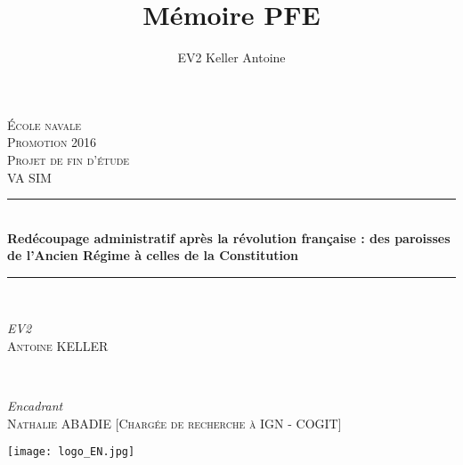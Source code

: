 \documentclass[a4paper]{book}
\title{Mémoire PFE}
\author{EV2 Keller Antoine}
\begin{document}
\begin{titlepage} %
	\newcommand{\HRule}{\rule{\linewidth}{0.5mm}} %
	
	\center %
	
	
	\textsc{\LARGE École navale}\\[0.5cm] 
	\textsc{\LARGE Promotion 2016}\\[0.5cm]
	\textsc{\Large Projet de fin d'étude}\\[0.5cm] 
	\textsc{\large VA SIM}\\[0.5cm] 
	\HRule\\[0.4cm]
	
	{\huge\bfseries  Redécoupage administratif après la révolution française : des paroisses de l’Ancien Régime à celles de la Constitution}\\[0.4cm] %
	
	\HRule\\[1.5cm]
	
	
	\begin{minipage}{0.4\textwidth}
		\begin{flushleft}
			\large
			\textit{EV2}\\
			\textsc{Antoine KELLER}\\%
		\end{flushleft}
	\end{minipage}
	~
	\begin{minipage}{0.4\textwidth}
		\begin{flushright}
			\large
			\textit{Encadrant}\\
			 \textsc{Nathalie ABADIE [Chargée de recherche à IGN - COGIT]} %
		\end{flushright}
	\end{minipage}
	\vfill\vfill
    
	\texttt{[image: logo\_EN.jpg]}\\ 
\vfill\vfill
\end{titlepage}
	
	 
	
\end{document}
